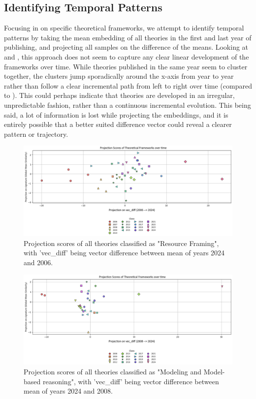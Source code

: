 \subsection{Identifying Temporal Patterns}
Focusing in on specific theoretical frameworks, we attempt to identify temporal patterns by taking the mean embedding of all theories in the first and last year of publishing, and projecting all samples on the difference of the means. Looking at  and , this approach does not seem to capture any clear linear development of the frameworks over time. While theories published in the same year seem to cluster together, the clusters jump sporadically around the x-axis from year to year rather than follow a clear incremental path from left to right over time (compared to ). This could perhaps indicate that theories are developed in an irregular, unpredictable fashion, rather than a continuous incremental evolution. This being said, a lot of information is lost while projecting the embeddings, and it is entirely possible that a better suited difference vector could reveal a clearer pattern or trajectory.
\begin{figure}%
    \centering
    \includegraphics[width=.9\linewidth]{media/resource_framing_temporal.png}
    \caption{Projection scores of all theories classified as "Resource Framing", with 'vec\_diff' being vector difference between mean of years 2024 and 2006.}
    \label{fig:110}
\end{figure}

\begin{figure}%
    \centering
    \includegraphics[width=.9\linewidth]{media/modeling_temporal.png}
    \caption{Projection scores of all theories classified as "Modeling and Model-based reasoning", with 'vec\_diff' being vector difference between mean of years 2024 and 2008.}
    \label{fig:111}
\end{figure}

